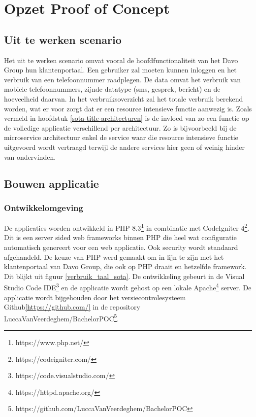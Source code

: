 \chapter{Opzet Proof of Concept}
\label{ch:opzet-poc}
\section{Uit te werken scenario}\label{poc-scenario}
Het uit te werken scenario omvat vooral de hoofdfunctionaliteit van het Davo Group hun klantenportaal. Een gebruiker zal moeten kunnen inloggen en het verbruik van een telefoonnummer raadplegen. De data omvat het verbruik van mobiele telefoonnummers, zijnde datatype (sms, gesprek, bericht) en de hoeveelheid daarvan. In het verbruiksoverzicht zal het totale verbruik berekend worden, wat er voor zorgt dat er een resource intensieve functie aanwezig is. Zoals vermeld in hoofdstuk \ref{sota-title-architecturen} is de invloed van zo een functie op de volledige applicatie verschillend per architectuur. Zo is bijvoorbeeld bij de microservice architectuur enkel de service waar die resource intensieve functie uitgevoerd wordt vertraagd terwijl de andere services hier geen of weinig hinder van ondervinden. 

\section{Bouwen applicatie}
\subsection{Ontwikkelomgeving}\label{poc-ontwikkelomgeving}
De applicaties worden ontwikkeld in PHP 8.3\footnote{https://www.php.net/} in combinatie met CodeIgniter 4\footnote{https://codeigniter.com/}. Dit is een server sided web frameworks binnen PHP die heel wat configuratie automatisch genereert voor een web applicatie. Ook security wordt standaard afgehandeld. De keuze van PHP werd gemaakt om in lijn te zijn met het klantenportaal van Davo Group, die ook op PHP draait en hetzelfde framework. Dit blijkt uit figuur \ref{verbruik_taal_sota}. De ontwikkeling gebeurt in de Visual Studio Code IDE\footnote{https://code.visualstudio.com/} en de applicatie wordt gehost op een lokale Apache\footnote{https://httpd.apache.org/} server. De applicatie wordt bijgehouden door het versiecontrolesysteem Github\ref{https://github.com/} in de repository LuccaVanVeerdeghem/BachelorPOC\footnote{https://github.com/LuccaVanVeerdeghem/BachelorPOC}. \\%


